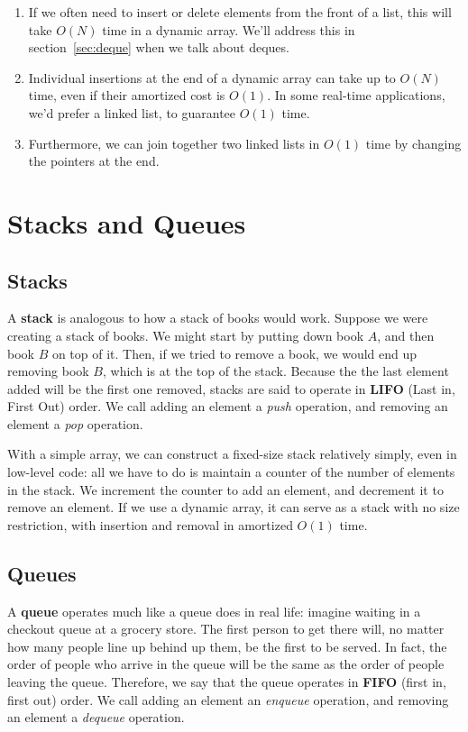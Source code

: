\begin{enumerate}
    \item If we often need to insert or delete elements from the front of a list, this will take $O(N)$ time in a dynamic array. We'll address this in section~\ref{sec:deque} when we talk about deques.
    \item Individual insertions at the end of a dynamic array can take up to $O(N)$ time, even if their amortized cost is $O(1)$. In some real-time applications, we'd prefer a linked list, to guarantee $O(1)$ time.
    \item Furthermore, we can join together two linked lists in $O(1)$ time by changing the pointers at the end.
\end{enumerate}


\section{Stacks and Queues}

\subsection{Stacks}

A \textbf{stack} is analogous to how a stack of books would work. Suppose we were creating a stack of books. We might start by putting down book $A$, and then book $B$ on top of it. Then, if we tried to remove a book, we would end up removing book $B$, which is at the top of the stack. Because the the last element added will be the first one removed, stacks are said to operate in \textbf{LIFO} (Last in, First Out) order. We call adding an element a \textit{push} operation, and removing an element a \textit{pop} operation.

With a simple array, we can construct a fixed-size stack relatively simply, even in low-level code: all we have to do is maintain a counter of the number of elements in the stack. We increment the counter to add an element, and decrement it to remove an element. If we use a dynamic array, it can serve as a stack with no size restriction, with insertion and removal in amortized $O(1)$ time.


\subsection{Queues}

A \textbf{queue} operates much like a queue does in real life: imagine waiting in a checkout queue at a grocery store. The first person to get there will, no matter how many people line up behind up them, be the first to be served. In fact, the order of people who arrive in the queue will be the same as the order of people leaving the queue. Therefore, we say that the queue operates in \textbf{FIFO} (first in, first out) order. We call adding an element an \textit{enqueue} operation, and removing an element a \textit{dequeue} operation.


